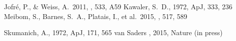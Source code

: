\documentclass[letterpaper,11pt,preprint]{hack_aastex}
\begin{document}
\begin{multicols}{2}
\begin{thebibliography}{}
Jofr{\'e}, P., \& Weiss, A.\ 2011, \aap, 533, A59
Kawaler, S.~D., 1972, ApJ, 333, 236
Meibom, S., Barnes, S.~A., Platais, I., et al.\ 2015, \nat, 517, 589


Skumanich, A., 1972, ApJ, 171, 565
van Saders \etal, 2015, Nature (in press)

\end{thebibliography}
\end{multicols}
\end{document}
